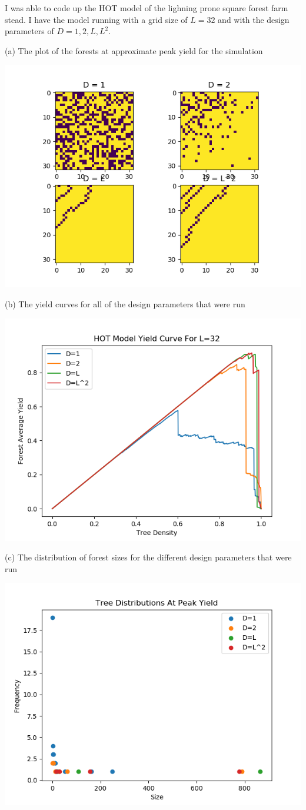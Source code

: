 I was able to code up the HOT model of the lighning prone square forest farm stead. I have the model running with a grid size of $L=32$ and with the design parameters of $D = {1, 2, L, L^2}$.

(a) The plot of the forests at approximate peak yield for the simulation

\includegraphics{../images/best-yield-forests.png}

(b) The yield curves for all of the design parameters that were run

\includegraphics{../images/yield-curve.png}

(c) The distribution of forest sizes for the different design parameters that were run

\includegraphics{../images/forest-size-distribution.png}